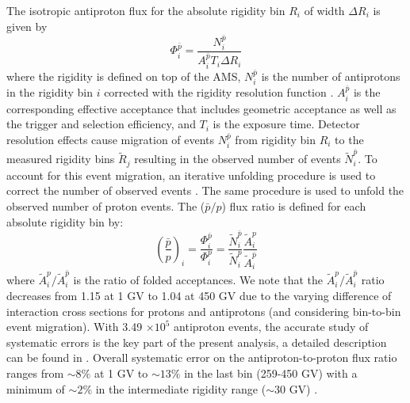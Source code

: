 \documentclass[twocolumn,twoside,slac_two]{revtex4-1}
\begin{document}
The isotropic antiproton flux for the absolute
rigidity bin $R_i$ of width $\Delta R_i$ is given by
\begin{equation}\label{eq:phi}
\Phi_i^{\bar{p}}= \frac{N_i^{\bar{p}}}{A_i^{\bar{p}}T_i\Delta R_i}
\end{equation}
where the rigidity is defined on top of the AMS, $N^{\bar{p}}_i$
is the number of antiprotons in the rigidity bin $i$ corrected with
the rigidity resolution function \cite{ref:AMS2_pbar}. 
$A^{\bar{p}}_i$ is the corresponding effective acceptance
that includes geometric
acceptance as well as the trigger and selection efficiency,
and $T_i$ is the exposure time.
Detector resolution effects cause migration of events $N^{\bar{p}}_i$
from rigidity bin $R_i$ to the measured rigidity bins $\tilde{R}_j$
resulting in the observed number of events $\tilde{N}_i^{\bar{p}}$.
To account for this event migration, an iterative unfolding
procedure is used to correct the number of observed
events \cite{ref:AMS2_protons,ref:AMS2_pbar}.
The same procedure is used to unfold the observed number
of proton events.
The ($\bar{p}/p$) flux ratio is defined for each absolute rigidity
bin by:
\begin{equation}\label{eq:rat}
  \left(\frac{\bar{p}}{p}\right)_i = \frac{\Phi_i^{\bar{p}}}{\Phi_i^{p}}=\frac{\tilde{N}_i^{\bar{p}}}{\tilde{N}_i^{p}}\frac{\tilde{A}_i^{p}}{\tilde{A}_i^{\bar{p}}}
\end{equation}
where $\tilde{A}_i^{p}/\tilde{A}_i^{\bar{p}}$ is the ratio of folded acceptances.
We note that the $\tilde{A}_i^{p}/\tilde{A}_i^{\bar{p}}$
ratio decreases from 1.15 at 1 GV to 1.04 at 450 GV due to the varying difference of
interaction cross sections for protons and antiprotons (and
 considering bin-to-bin event migration).
With 3.49 $\times 10^5$ antiproton events, the accurate study of
systematic errors is the key part of the present analysis,
a detailed description can be found in \cite{ref:AMS2_pbar}.
%
Overall systematic error on the antiproton-to-proton flux ratio ranges
from $\sim 8\%$ at 1 GV to $\sim 13\%$ in the last bin (259-450 GV)
with a minimum of $\sim 2\%$ in the intermediate rigidity range ($\sim 30$ GV)
\cite{ref:AMS2_pbar}.
\end{document}
